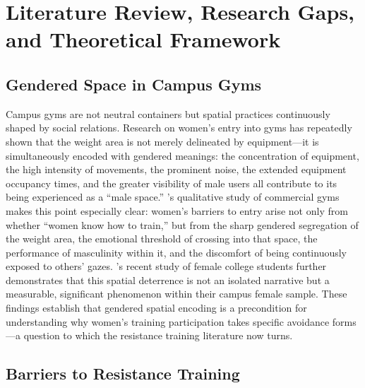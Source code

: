 \section{Literature Review, Research Gaps, and Theoretical Framework}

\subsection{Gendered Space in Campus Gyms}

Campus gyms are not neutral containers but spatial practices continuously shaped by social relations.
Research on women's entry into gyms has repeatedly shown that the weight area is not merely delineated by equipment---it is simultaneously encoded with gendered meanings:
the concentration of equipment, the high intensity of movements, the prominent noise, the extended equipment occupancy times, and the greater visibility of male users all contribute to its being experienced as a ``male space.''
\textcite{turnock2021gyms}'s qualitative study of commercial gyms makes this point especially clear:
women's barriers to entry arise not only from whether ``women know how to train,'' but from the sharp gendered segregation of the weight area, the emotional threshold of crossing into that space, the performance of masculinity within it, and the discomfort of being continuously exposed to others' gazes.
\textcite{rendall2024gym}'s recent study of female college students further demonstrates that this spatial deterrence is not an isolated narrative but a measurable, significant phenomenon within their campus female sample.
These findings establish that gendered spatial encoding is a precondition for understanding why women's training participation takes specific avoidance forms---a question to which the resistance training literature now turns.

\subsection{Barriers to Resistance Training}

